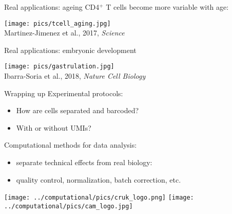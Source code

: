 \documentclass{beamer}
\begin{document}
\begin{frame}{Real applications: ageing}
CD4$^+$ T cells become more variable with age: 
\begin{center}
\texttt{[image: pics/tcell\_aging.jpg]} \\
{\tiny Martinez-Jimenez et al., 2017, \textit{Science}}
\end{center}
\end{frame}

\begin{frame}{Real applications: embryonic development}
\begin{center}
\texttt{[image: pics/gastrulation.jpg]} \\
{\tiny Ibarra-Soria et al., 2018, \textit{Nature Cell Biology}}
\end{center}
\end{frame}

\begin{frame}{Wrapping up}
Experimental protocols:
\begin{itemize}
\item How are cells separated and barcoded?
\item With or without UMIs?
\end{itemize}

Computational methods for data analysis:
\begin{itemize}
\item separate technical effects from real biology:
\item quality control, normalization, batch correction, etc.
\end{itemize}
\vspace{0.1in}
\begin{center}
\texttt{[image: ../computational/pics/cruk\_logo.png]} \hspace{0.1in}
\texttt{[image: ../computational/pics/cam\_logo.jpg]} 
\end{center}
\end{frame}
\end{document}
